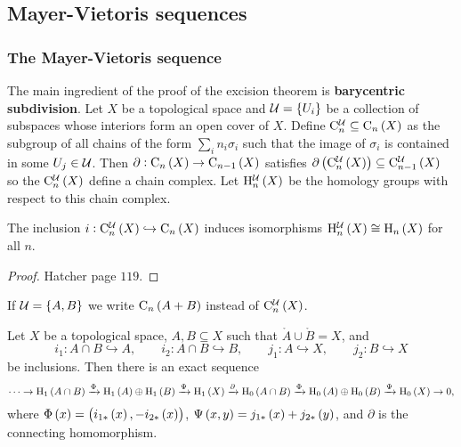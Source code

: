 \subsection{Mayer-Vietoris sequences}

\subsubsection{The Mayer-Vietoris sequence}

The main ingredient of the proof of the excision theorem is \textbf{barycentric subdivision}. Let $ X $ be a topological space and $ \UUU = \cbr{U_i} $ be a collection of subspaces whose interiors form an open cover of $ X $. Define $ \C_n^\UUU \subseteq \C_n\br{X} $ as the subgroup of all chains of the form $ \sum_i n_i\sigma_i $ such that the image of $ \sigma_i $ is contained in some $ U_j \in \mathcal{U} $. Then $ \partial : \C_n\br{X} \to \C_{n - 1}\br{X} $ satisfies $ \partial\br{\C_n^\UUU\br{X}} \subseteq \C_{n - 1}^\UUU\br{X} $ so the $ \C_n^\UUU\br{X} $ define a chain complex. Let $ \H_n^\UUU\br{X} $ be the homology groups with respect to this chain complex.

\begin{proposition}
The inclusion $ i : \C_n^\UUU\br{X} \hookrightarrow \C_n\br{X} $ induces isomorphisms $ \H_n^\UUU\br{X} \cong \H_n\br{X} $ for all $ n $.
\end{proposition}

\begin{proof}
Hatcher page $ 119 $.
\end{proof}

\begin{notation*}
If $ \UUU = \cbr{A, B} $ we write $ \C_n\br{A + B} $ instead of $ \C_n^\UUU\br{X} $.
\end{notation*}

\pagebreak

\begin{theorem}
Let $ X $ be a topological space, $ A, B \subseteq X $ such that $ \mathring{A} \cup \mathring{B} = X $, and
$$ i_1 : A \cap B \hookrightarrow A, \qquad i_2 : A \cap B \hookrightarrow B, \qquad j_1 : A \hookrightarrow X, \qquad j_2 : B \hookrightarrow X $$
be inclusions. Then there is an exact sequence
$$ \dots \to \H_1\br{A \cap B} \xrightarrow{\Phi} \H_1\br{A} \oplus \H_1\br{B} \xrightarrow{\Psi} \H_1\br{X} \xrightarrow{\partial} \H_0\br{A \cap B} \xrightarrow{\Phi} \H_0\br{A} \oplus \H_0\br{B} \xrightarrow{\Psi} \H_0\br{X} \to 0, $$
where $ \Phi\br{x} = \br{i_{1*}\br{x}, -i_{2*}\br{x}} $, $ \Psi\br{x, y} = j_{1*}\br{x} + j_{2*}\br{y} $, and $ \partial $ is the connecting homomorphism.
\end{theorem}

